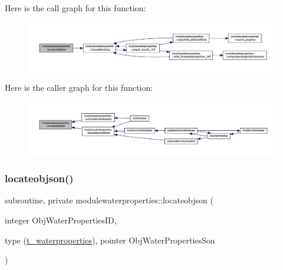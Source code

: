 Here is the call graph for this function\+:\nopagebreak
\begin{figure}[H]
\begin{center}
\leavevmode
\includegraphics[width=350pt]{namespacemodulewaterproperties_abe99a26b781f6af9708e4db390fcdcba_cgraph}
\end{center}
\end{figure}
Here is the caller graph for this function\+:\nopagebreak
\begin{figure}[H]
\begin{center}
\leavevmode
\includegraphics[width=350pt]{namespacemodulewaterproperties_abe99a26b781f6af9708e4db390fcdcba_icgraph}
\end{center}
\end{figure}
\mbox{\label{namespacemodulewaterproperties_aa9cca4cb017da12a540fca143edcc19f}} 
\subsubsection{\texorpdfstring{locateobjson()}{locateobjson()}}
{\footnotesize\ttfamily subroutine, private modulewaterproperties\+::locateobjson (\begin{DoxyParamCaption}\item[{integer}]{Obj\+Water\+Properties\+ID,  }\item[{type (\mbox{\hyperlink{structmodulewaterproperties_1_1t__waterproperties}{t\+\_\+waterproperties}}), pointer}]{Obj\+Water\+Properties\+Son }\end{DoxyParamCaption})\hspace{0.3cm}{\ttfamily [private]}}

